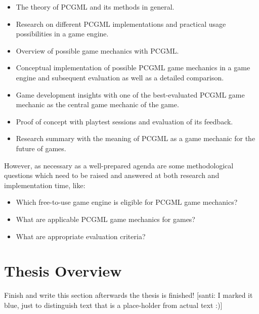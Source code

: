 \documentclass[MGS,Master,english]{twbook}%
\begin{document}
\begin{itemize}
	\item The theory of \ac{PCGML} and its methods in general.
	\item Research on different \ac{PCGML} implementations and practical usage possibilities in a game engine.
	\item Overview of possible game mechanics with \ac{PCGML}.
	\item Conceptual implementation of possible \ac{PCGML} game mechanics in a game engine and subsequent evaluation as well as a detailed comparison.
	\item Game development insights with one of the best-evaluated PCGML game mechanic as the central game mechanic of the game.
	\item Proof of concept with playtest sessions and evaluation of its feedback.
	\item Research summary with the meaning of \ac{PCGML} as a game mechanic for the future of games. 
\end{itemize}
However, as necessary as a well-prepared agenda are some methodological questions which need to be raised and answered at both research and implementation time, like:
\begin{itemize}
	\item Which free-to-use game engine is eligible for PCGML game mechanics?
	\item What are applicable PCGML game mechanics for games?
	\item What are appropriate evaluation criteria? 
\end{itemize} 


\section{Thesis Overview}
{\color{blue}Finish and write this section afterwards the thesis is finished!} {\color{red} [santi: I marked it blue, just to distinguish text that is a place-holder from actual text :)]}
\end{document}
